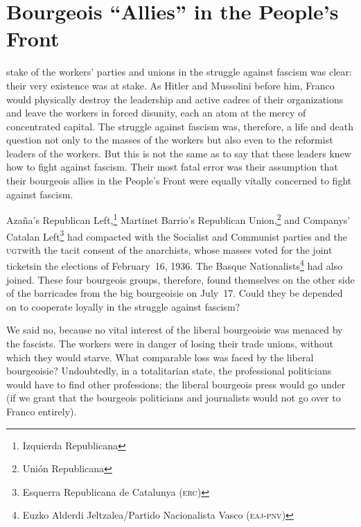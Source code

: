 \chapter{Bourgeois “Allies” in the People's Front}

 stake of the workers’ parties and unions in the struggle against fascism was clear: their very existence was at stake. As Hitler and Mussolini before him, Franco{\indexFFranco} would physically destroy the leadership and active cadres of their organizations and leave the workers in forced disunity, each an atom at the mercy of concentrated capital. The struggle against fascism was, therefore, a life and death question not only to the masses of the workers but also even to the reformist leaders of the workers. But this is not the same as to say that these leaders knew how to fight against fascism. Their most fatal error was their assumption that their bourgeois allies in the People’s Front were equally vitally concerned to fight against fascism.

Azaña's Republican Left,\footnote{Izquierda Republicana} Martinet Barrio's Republican Union,\footnote{Unión Republicana} and Companys' Catalan Left\footnote{Esquerra Republicana de Catalunya (\textsc{erc})} had compacted with the Socialist and Communist parties and the \textsc{ugt}\textemdash{}with the tacit consent of the anarchists, whose masses voted for the joint tickets\textemdash{}in the elections of February~16, 1936. The Basque Nationalists\footnote{Euzko Alderdi Jeltzalea/Partido Nacionalista Vasco (\textsc{eaj-pnv})} had also joined. These four bourgeois groups, therefore, found themselves on the other side of the barricades from the big bourgeoisie on July~17. Could they be depended on to cooperate loyally in the struggle against fascism?

We said no, because no vital interest of the liberal bourgeoisie was menaced by the fascists. The workers were in danger of losing their trade unions, without which they would starve. What comparable loss was faced by the liberal bourgeoisie? Undoubtedly, in a totalitarian state, the professional politicians would have to find other professions; the liberal bourgeois press would go under (if we grant that the bourgeois politicians and journalists would not go over to Franco entirely).
\noclub

